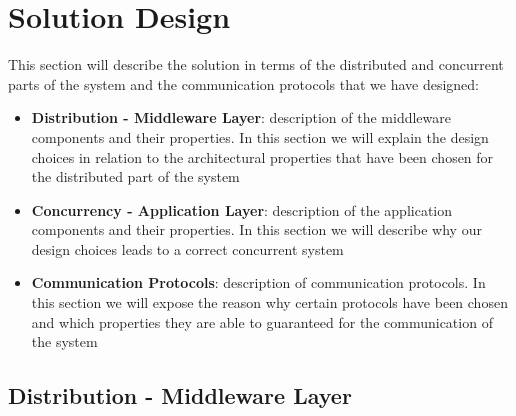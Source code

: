 \section{Solution Design}

This section will describe the solution in terms of the distributed and concurrent parts of the system and the communication protocols that we have designed:

\begin{itemize}
\item \textbf{Distribution - Middleware Layer}: 
	description of the middleware components and their properties. In this section we will explain the design choices in relation to the architectural properties that have been chosen 
	for the distributed part of the system
\item \textbf{Concurrency - Application Layer}: 
	description of the application components and their properties. In this section we will describe why our design choices leads to a correct concurrent system 
\item \textbf{Communication Protocols}: 
	description of communication protocols. In this section we will expose the reason why certain protocols have been chosen and which properties they are able to guaranteed for 
	the communication of the system
\end{itemize}

\subsection{Distribution - Middleware Layer}







